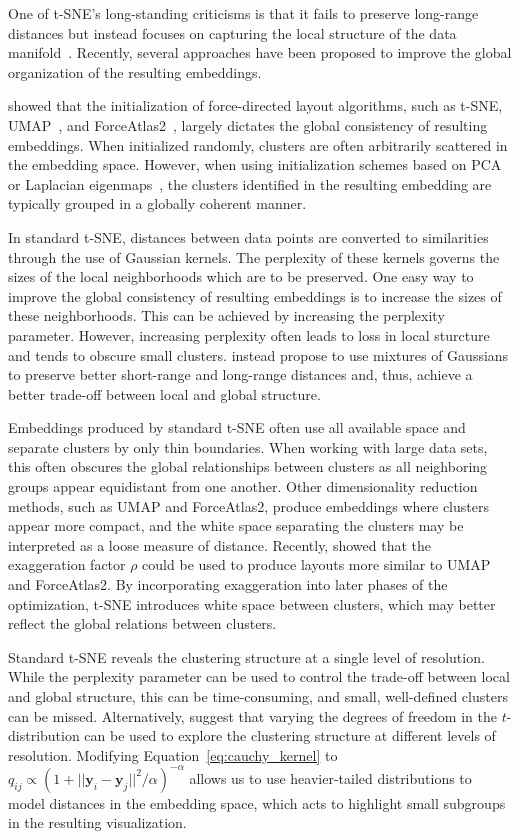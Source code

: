 \documentclass[article]{jss}
\begin{document}
One of t-SNE's long-standing criticisms is that it fails to preserve long-range
distances but instead focuses on capturing the local structure of the data
manifold~\citep{becht2019dimensionality}. Recently, several approaches have been
proposed to improve the global organization of the resulting embeddings.

\citet{kobak2019umap} showed that the initialization of force-directed layout
algorithms, such as t-SNE, UMAP~\citep{2018arXivUMAP}, and
ForceAtlas2~\citep{jacomy2014forceatlas2}, largely dictates the global
consistency of resulting embeddings. When initialized randomly, clusters are
often arbitrarily scattered in the embedding space. However, when using
initialization schemes based on PCA or Laplacian eigenmaps~\citep{belkin2001laplacian}, the clusters identified in the resulting embedding are typically grouped in a globally
coherent manner.

In standard t-SNE, distances between data points are converted to similarities
through the use of Gaussian kernels. The perplexity of these kernels governs the
sizes of the local neighborhoods which are to be preserved. One easy way to
improve the global consistency of resulting embeddings is to increase the sizes
of these neighborhoods. This can be achieved by increasing the perplexity
parameter. However, increasing perplexity often leads to loss in local sturcture
and tends to obscure small clusters. \citet{kobak2019art} instead propose to use
mixtures of Gaussians to preserve better short-range and long-range distances
and, thus, achieve a better trade-off between local and global structure.

Embeddings produced by standard t-SNE often use all available space and separate
clusters by only thin boundaries. When working with large data sets, this often
obscures the global relationships between clusters as all neighboring groups
appear equidistant from one another.  Other dimensionality reduction methods,
such as UMAP and ForceAtlas2, produce embeddings where clusters appear more
compact, and the white space separating the clusters may be interpreted as a
loose measure of distance. Recently, \citet{bohm2020unifying} showed that the
exaggeration factor $\rho$ could be used to produce layouts more similar to UMAP
and ForceAtlas2. By incorporating exaggeration into later phases of the
optimization, t-SNE introduces white space between clusters, which may better
reflect the global relations between clusters.

Standard t-SNE reveals the clustering structure at a single level of resolution.
While the perplexity parameter can be used to control the trade-off between
local and global structure, this can be time-consuming, and small, well-defined
clusters can be missed. Alternatively, \citet{kobak2019heavy} suggest that
varying the degrees of freedom in the $t$-distribution can be used to explore
the clustering structure at different levels of resolution. Modifying
Equation~\ref{eq:cauchy_kernel} to $q_{ij} \propto \left ( 1 + || \mathbf{y}_i -
\mathbf{y}_j ||^2 / \alpha \right )^{-\alpha}$ allows us to use heavier-tailed
distributions to model distances in the embedding space, which acts to highlight
small subgroups in the resulting visualization.
\end{document}
